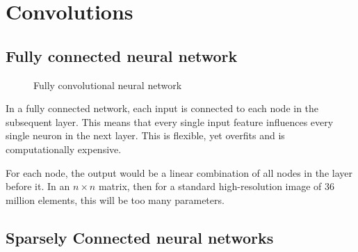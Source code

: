 \documentclass[11pt]{article}
\begin{document}
\section{Convolutions}

\subsection{Fully connected neural network}

\begin{figure}[H]
    \centering
    \caption{Fully convolutional neural network}
\end{figure}

In a fully connected network, each input is connected to each node in the subsequent layer. This means that every single input feature influences every single neuron in the next layer. This is flexible, yet overfits and is computationally expensive.

For each node, the output would be a linear combination of all nodes in the layer before it. In an $n\times n$ matrix, then for a standard high-resolution image of 36 million elements, this will be too many parameters.

\subsection{Sparsely Connected neural networks }
\end{document}

